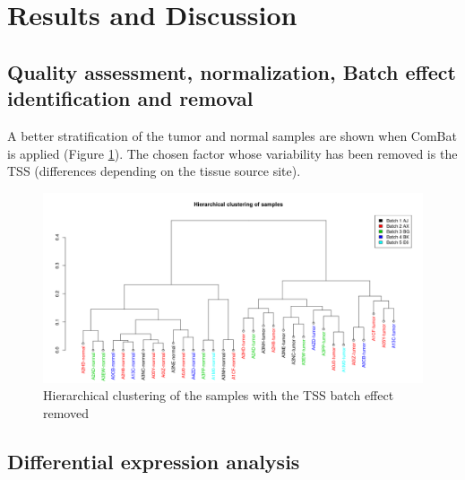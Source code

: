 \documentclass[9pt,twocolumn,twoside]{gsajnl}
\begin{document}
\section*{Results and Discussion}

\subsection*{Quality assessment, normalization, Batch effect identification and removal}

A better stratification of the tumor and normal samples are shown when ComBat is applied (Figure \ref{fig:Hierarchical clustering}). The chosen factor whose variability has been removed is the TSS (differences depending on the tissue source site).

\begin{figure}[htbp]
\centering
\includegraphics[width=\linewidth]{sampleClustering_3-1}
\caption{Hierarchical clustering of the samples with the TSS batch effect removed}
\label{fig:Hierarchical clustering}
\end{figure}

\subsection*{Differential expression analysis}
\end{document}

